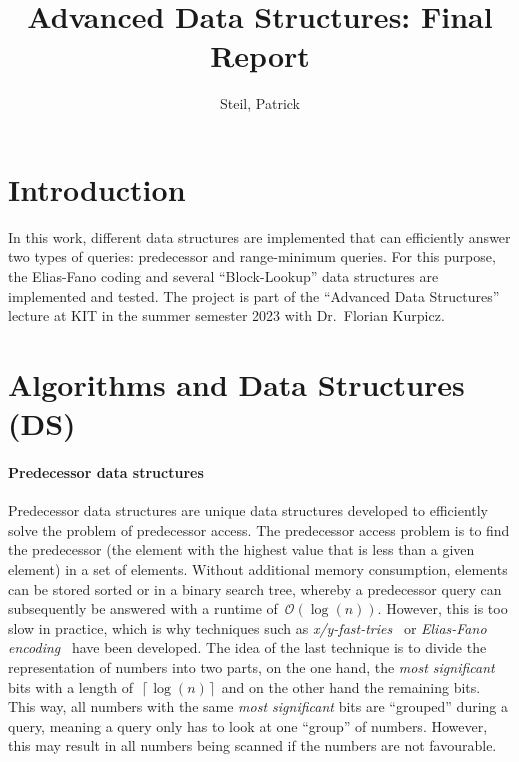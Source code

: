 \documentclass[a4paper,UKenglish,cleveref, autoref, thm-restate]{lipics-v2021}
\title{Advanced Data Structures: Final Report}
\author{Steil, Patrick}{2513240}{patrick.steil@student.kit.edu}{}{}
\begin{document}
	
	\maketitle
	
	\section{Introduction}
	\label{sec:introduction}
	
	In this work, different data structures are implemented that can efficiently answer two types of queries: predecessor and range-minimum queries. For this purpose, the Elias-Fano coding and several “Block-Lookup” data structures are implemented and tested. The project is part of the “Advanced Data Structures” lecture at KIT in the summer semester 2023 with Dr.~Florian Kurpicz.
	\section{Algorithms and Data Structures (DS)}
	\label{sec:algorithms}
	\paragraph*{Predecessor data structures}
	Predecessor data structures are unique data structures developed to efficiently solve the problem of predecessor access. The predecessor access problem is to find the predecessor (the element with the highest value that is less than a given element) in a set of elements.
	Without additional memory consumption, elements can be stored sorted or in a binary search tree, whereby a predecessor query can subsequently be answered with a runtime of~$\mathcal{O}\left(\log(n)\right)$. However, this is too slow in practice, which is why techniques such as \textit{x/y-fast-tries}~\cite{WILLARD198381} or \textit{Elias-Fano encoding}~\cite{10.1145/321812.321820} have been developed. The idea of the last technique is to divide the representation of numbers into two parts, on the one hand, the \textit{most significant} bits with a length of~$\left\lceil\log\left(n\right)\right\rceil$ and on the other hand the remaining bits. This way, all numbers with the same \textit{most significant} bits are ``grouped'' during a query, meaning a query only has to look at one ``group'' of numbers. However, this may result in all numbers being scanned if the numbers are not favourable.	
\end{document}
